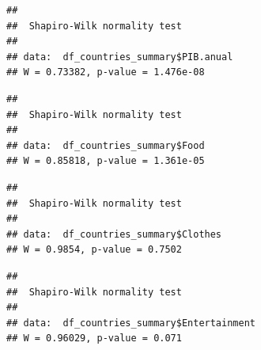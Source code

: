 \documentclass[
]{article}
\newenvironment{Shaded}{\begin{snugshade}}{\end{snugshade}}
\newcommand{\CommentTok}[1]{\textcolor[rgb]{0.56,0.35,0.01}{\textit{#1}}}
\newcommand{\FunctionTok}[1]{\textcolor[rgb]{0.13,0.29,0.53}{\textbf{#1}}}
\newcommand{\NormalTok}[1]{#1}
\newcommand{\SpecialCharTok}[1]{\textcolor[rgb]{0.81,0.36,0.00}{\textbf{#1}}}
\begin{document}
\begin{Shaded}
\end{Shaded}

\begin{verbatim}
## 
##  Shapiro-Wilk normality test
## 
## data:  df_countries_summary$PIB.anual
## W = 0.73382, p-value = 1.476e-08
\end{verbatim}

\begin{Shaded}
\end{Shaded}

\begin{verbatim}
## 
##  Shapiro-Wilk normality test
## 
## data:  df_countries_summary$Food
## W = 0.85818, p-value = 1.361e-05
\end{verbatim}

\begin{Shaded}
\end{Shaded}

\begin{verbatim}
## 
##  Shapiro-Wilk normality test
## 
## data:  df_countries_summary$Clothes
## W = 0.9854, p-value = 0.7502
\end{verbatim}

\begin{Shaded}
\end{Shaded}

\begin{verbatim}
## 
##  Shapiro-Wilk normality test
## 
## data:  df_countries_summary$Entertainment
## W = 0.96029, p-value = 0.071
\end{verbatim}
\end{document}

